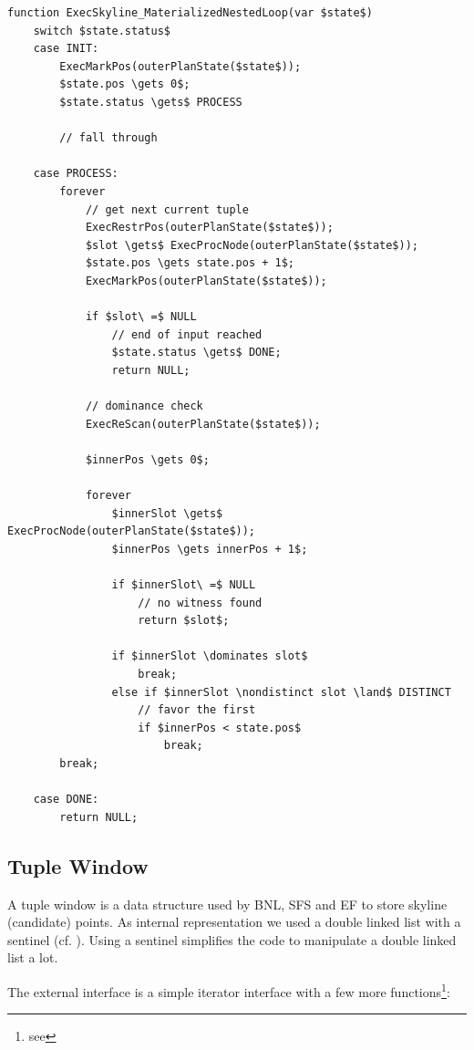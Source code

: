 \enlargethispage{-\baselineskip}
\begin{lstlisting}[language=pseudo,
caption={MNL},
label={code:mnl}
]
function ExecSkyline_MaterializedNestedLoop(var $state$)
	switch $state.status$
	case INIT:
		ExecMarkPos(outerPlanState($state$));
		$state.pos \gets 0$;
		$state.status \gets$ PROCESS

		// fall through

	case PROCESS:
		forever
			// get next current tuple
			ExecRestrPos(outerPlanState($state$));
			$slot \gets$ ExecProcNode(outerPlanState($state$));
			$state.pos \gets state.pos + 1$;
			ExecMarkPos(outerPlanState($state$));

			if $slot\ =$ NULL
				// end of input reached
				$state.status \gets$ DONE;
				return NULL;

			// dominance check
			ExecReScan(outerPlanState($state$));

			$innerPos \gets 0$;

			forever
				$innerSlot \gets$ ExecProcNode(outerPlanState($state$));
				$innerPos \gets innerPos + 1$;

				if $innerSlot\ =$ NULL
					// no witness found
					return $slot$;

				if $innerSlot \dominates slot$
					break;
				else if $innerSlot \nondistinct slot \land$ DISTINCT
					// favor the first
					if $innerPos < state.pos$
						break;
		break;

	case DONE:
		return NULL;
\end{lstlisting}

\subsection{Tuple Window}
A tuple window is a data structure used by BNL, SFS and EF to store
skyline (candidate) points. As internal representation we used a double
linked list with a sentinel (cf. \citep[Page 204--209]{Cormen2001}).
Using a sentinel simplifies the code to manipulate a double linked
list a lot.

The external interface is a simple iterator interface with a few more
functions\footnote{see }:

